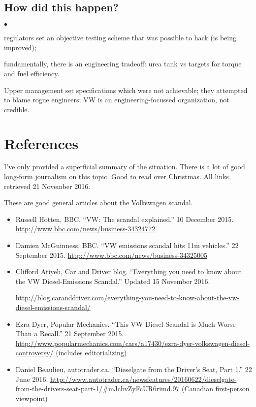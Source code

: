 \documentclass[11pt]{article}
\newcommand{\squishlist}{
 \begin{list}{$\bullet$}
  { \setlength{\itemsep}{0pt}
     \setlength{\parsep}{3pt}
     \setlength{\topsep}{3pt}
     \setlength{\partopsep}{0pt}
     \setlength{\leftmargin}{1.5em}
     \setlength{\labelwidth}{1em}
     \setlength{\labelsep}{0.5em} } }
\newcommand{\squishend}{
  \end{list}  }
\begin{document}
\subsection*{How did this happen?}
\squishlist
\item regulators set an objective testing scheme that was possible to hack (is being improved);
\item fundamentally, there is an engineering tradeoff: urea tank vs targets for torque and fuel efficiency.
\item Upper management set specifications which were not achievable; they attempted to blame rogue engineers; VW is an engineering-focussed organization, not credible.
\squishend

\newpage
\section*{References}

I've only provided a superficial summary of the situation. There is a
lot of good long-form journalism on this topic. Good to read over Christmas.
All links retrieved 21 November 2016.

\noindent
These are good general articles about the Volkswagen scandal.

\begin{itemize}
\item Russell Hotten, BBC. ``VW: The scandal explained.'' 10 December 2015. \url{http://www.bbc.com/news/business-34324772}
\item Damien McGuinness, BBC. ``VW emissions scandal hits 11m vehicles.'' 22 September 2015. \url{http://www.bbc.com/news/business-34325005}
\item Clifford Atiyeh, Car and Driver blog. ``Everything you need to know about the VW Diesel-Emissions Scandal.'' Updated 15 November 2016. 

\url{http://blog.caranddriver.com/everything-you-need-to-know-about-the-vw-diesel-emissions-scandal/}
\item Ezra Dyer, Popular Mechanics. ``This VW Diesel Scandal is Much Worse Than a Recall.'' 21 September 2015. \url{http://www.popularmechanics.com/cars/a17430/ezra-dyer-volkswagen-diesel-controversy/} (includes editorializing)
\item Daniel Beaulieu, autotrader.ca. ``Dieselgate from the Driver's Seat, Part 1.'' 22 June 2016. \url{http://www.autotrader.ca/newsfeatures/20160622/dieselgate-from-the-drivers-seat-part-1/#mJcbvZyFcUR6rimd.97} (Canadian first-person viewpoint)
\end{itemize}
\end{document}
